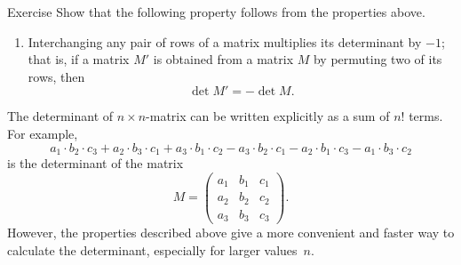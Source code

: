 \begin{thm}{Exercise}
Show that the following property follows from the properties above.
\end{thm}

\begin{enumerate}[resume]
 \item Interchanging any pair of rows of a matrix multiplies its determinant by $-1$; that is, if a matrix $M'$ is obtained from a matrix $M$ by permuting two of its rows, then 
\[\det M'=-\det M.\]
\end{enumerate}

The determinant of $n\times n$-matrix can be written explicitly as a sum of $n!$ terms. 
For example, 
\[
a_1{\cdot} b_2{\cdot} c_3+a_2{\cdot} b_3{\cdot} c_1+a_3{\cdot} b_1{\cdot} c_2-a_3{\cdot} b_2{\cdot} c_1-a_2{\cdot} b_1{\cdot} c_3-a_1{\cdot} b_3{\cdot} c_2\]
is the determinant of the matrix
\[M=\left(
\begin{matrix}
a_1&b_1&c_1
\\
a_2&b_2&c_2
\\
a_3&b_3&c_3
\end{matrix}
\right).\]
However, the properties described above give a more convenient and faster way to calculate the determinant, especially for larger values~$n$.

